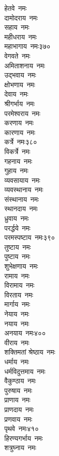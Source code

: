 \begin{multicols}{\maxColumns}
\begin{flushleft}
हेतवे~नमः\\
दामोदराय~नमः\\
सहाय~नमः\\
महीधराय~नमः\\
महाभागाय~नमः\hfill ३७०\\
वेगवते~नमः\\
अमिताशनाय~नमः\\
उद्भवाय~नमः\\
क्षोभणाय~नमः\\
देवाय~नमः\\
श्रीगर्भाय~नमः\\
परमेश्वराय~नमः\\
करणाय~नमः\\
कारणाय~नमः\\
कर्त्रे~नमः\hfill ३८०\\
विकर्त्रे~नमः\\
गहनाय~नमः\\
गुहाय~नमः\\
व्यवसायाय~नमः\\
व्यवस्थानाय~नमः\\
संस्थानाय~नमः\\
स्थानदाय~नमः\\
ध्रुवाय~नमः\\
परर्द्धये~नमः\\
परमस्पष्टाय~नमः\hfill ३९०\\
तुष्टाय~नमः\\
पुष्टाय~नमः\\
शुभेक्षणाय~नमः\\
रामाय~नमः\\
विरामाय~नमः\\
विरताय~नमः\\
मार्गाय~नमः\\
नेयाय~नमः\\
नयाय~नमः\\
अनयाय~नमः\hfill ४००\\
वीराय~नमः\\
शक्तिमतां श्रेष्ठाय~नमः\\
धर्माय~नमः\\
धर्मविदुत्तमाय~नमः\\
वैकुण्ठाय~नमः\\
पुरुषाय~नमः\\
प्राणाय~नमः\\
प्राणदाय~नमः\\
प्रणवाय~नमः\\
पृथवे~नमः\hfill ४१०\\
हिरण्यगर्भाय~नमः\\
शत्रुघ्नाय~नमः\\

\end{flushleft}
\end{multicols}
